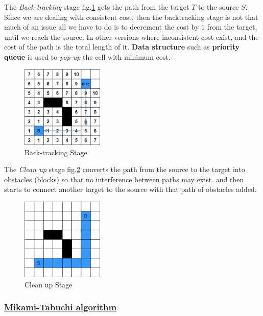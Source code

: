     The \textit{Back-tracking} stage fig.\ref{fig:backtrackingStage} gets the path from the target $T$
    to the source $S$.
    Since we are dealing with consistent cost, then the backtracking stage is not that much of an issue
    all we have to do is to decrement the cost by $1$ from the target, until we reach the source.
    In other versions where inconsistent cost exist, and the cost of the path is the total length of it.
    \textbf{Data structure} such as \textbf{priority queue} is used to \textit{pop-up}
    the cell with minimum cost.

    \begin{figure}[H]
        \centering
        \includegraphics[width=0.35\textwidth]{figures/Lee Stages/back-track.png}
        \caption{Back-tracking Stage}
        \label{fig:backtrackingStage}
    \end{figure}
    The \textit{Clean up} stage fig.\ref{fig:cleanUpStage} converts the path from the source
    to the target into obstacles (blocks) so that no interference between paths may exist.
    and then starts to connect another target to the source with that path of obstacles added.

    \begin{figure}[H]
        \centering
        \includegraphics[width=0.35\textwidth]{figures/Lee Stages/clean_up.png}
        \caption{Clean up Stage}
        \label{fig:cleanUpStage}
    \end{figure}

    \subsubsection{\underline{Mikami-Tabuchi algorithm}}
    \label{MikamiSection}
    

